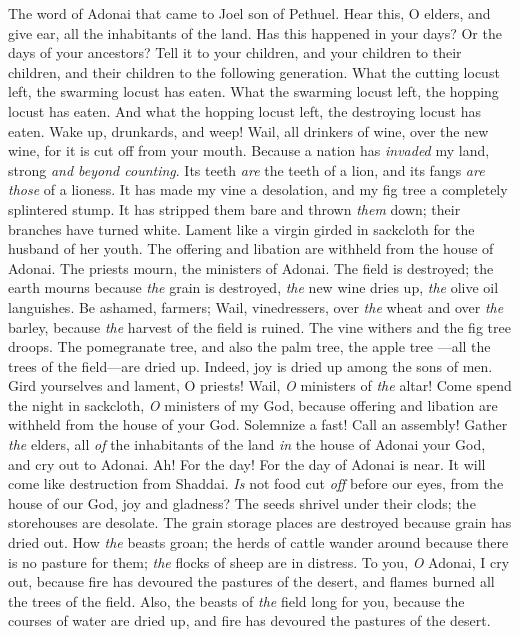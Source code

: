 
\begin{biblechapter} %
\verse The word of Adonai that came to Joel son of Pethuel.
 Hear this, O elders, 
and give ear, all the inhabitants of the land. 
Has this happened in your days? 
Or the days of your ancestors?
\verse Tell it to your children, 
and your children to their children, 
and their children to the following generation.
\verse What the cutting locust left, 
the swarming locust has eaten. 
What the swarming locust left, 
the hopping locust has eaten. 
And what the hopping locust left, 
the destroying locust has eaten.
\verse Wake up, drunkards, and weep! 
Wail, all drinkers of wine, over the new wine, 
for it is cut off from your mouth.
\verse Because a nation has \textit{invaded} my land, 
strong \textit{and beyond counting}. 
Its teeth \textit{are} the teeth of a lion, 
and its fangs \textit{are those} of a lioness.
\verse It has made my vine a desolation, 
and my fig tree a completely splintered stump. 
It has stripped them bare and thrown \textit{them} down; 
their branches have turned white.
\verse Lament like a virgin girded in sackcloth 
for the husband of her youth.
\verse The offering and libation are withheld 
from the house of Adonai. 
The priests mourn, 
the ministers of Adonai.
\verse The field is destroyed; 
the earth mourns 
because \textit{the} grain is destroyed, 
\textit{the} new wine dries up, 
\textit{the} olive oil languishes.
\verse Be ashamed, farmers; 
Wail, vinedressers, 
over \textit{the} wheat and over \textit{the} barley, 
because \textit{the} harvest of the field is ruined.
\verse The vine withers 
and the fig tree droops. 
The pomegranate tree, and also the palm tree, the apple tree 
—all the trees of the field—are dried up. 
Indeed, joy is dried up 
among the sons of men.
\verse Gird yourselves and lament, O priests! 
Wail, \textit{O} ministers of \textit{the} altar! 
Come spend the night in sackcloth, 
\textit{O} ministers of my God, 
because offering and libation 
are withheld from the house of your God.
\verse Solemnize a fast! 
Call an assembly! 
Gather \textit{the} elders, 
all \textit{of} the inhabitants of the land 
\textit{in} the house of Adonai your God, 
and cry out to Adonai.
\verse Ah! For the day! 
For the day of Adonai is near. 
It will come like destruction from Shaddai.
\verse \textit{Is} not food cut \textit{off} 
before our eyes, 
from the house of our God, 
joy and gladness?
\verse The seeds shrivel under their clods; 
the storehouses are desolate. 
The grain storage places are destroyed 
because grain has dried out.
\verse How \textit{the} beasts groan; 
the herds of cattle wander around 
because there is no pasture for them; 
\textit{the} flocks of sheep are in distress.
\verse To you, \textit{O} Adonai, I cry out, 
because fire has devoured 
the pastures of the desert, 
and flames burned 
all the trees of the field.
\verse Also, the beasts of \textit{the} field 
long for you, 
because the courses of water 
are dried up, 
and fire has devoured 
the pastures of the desert.
\end{biblechapter}

